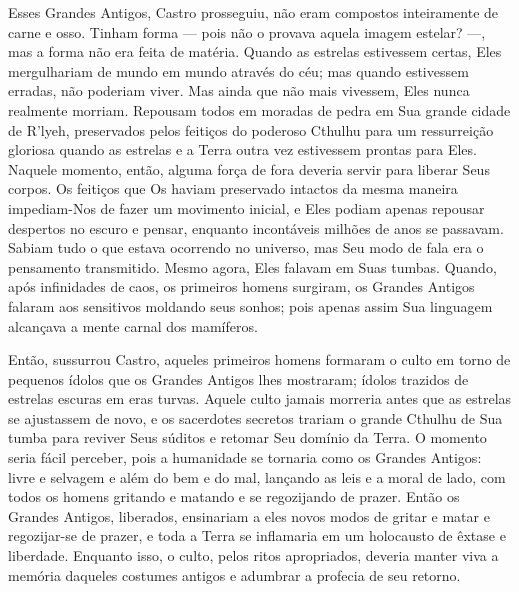 \begin{pages}
\begin{Rightside}
Esses Grandes Antigos, Castro prosseguiu, não eram compostos
inteiramente de carne e osso. Tinham forma --- pois não o provava aquela
imagem estelar? ---, mas a forma não era feita de matéria. Quando as
estrelas estivessem certas, Eles mergulhariam de mundo em mundo através
do céu; mas quando estivessem erradas, não poderiam viver. Mas ainda que
não mais vivessem, Eles nunca realmente morriam. Repousam todos em
moradas de pedra em Sua grande cidade de R'lyeh, preservados pelos
feitiços do poderoso Cthulhu para um ressurreição gloriosa quando as
estrelas e a Terra outra vez estivessem prontas para Eles. Naquele
momento, então, alguma força de fora deveria servir para liberar Seus
corpos. Os feitiços que Os haviam preservado intactos da mesma maneira
impediam-Nos de fazer um movimento inicial, e Eles podiam apenas
repousar despertos no escuro e pensar, enquanto incontáveis milhões de
anos se passavam. Sabiam tudo o que estava ocorrendo no universo, mas
Seu modo de fala era o pensamento transmitido. Mesmo agora, Eles falavam
em Suas tumbas. Quando, após infinidades de caos, os primeiros homens
surgiram, os Grandes Antigos falaram aos sensitivos moldando seus
sonhos; pois apenas assim Sua linguagem alcançava a mente carnal dos
mamíferos.

Então, sussurrou Castro, aqueles primeiros homens formaram o culto em
torno de pequenos ídolos que os Grandes Antigos lhes mostraram; ídolos
trazidos de estrelas escuras em eras turvas. Aquele culto jamais
morreria antes que as estrelas se ajustassem de novo, e os sacerdotes
secretos trariam o grande Cthulhu de Sua tumba para reviver Seus súditos
e retomar Seu domínio da Terra. O momento seria fácil perceber, pois a
humanidade se tornaria como os Grandes Antigos: livre e selvagem e além
do bem e do mal, lançando as leis e a moral de lado, com todos os homens
gritando e matando e se regozijando de prazer. Então os Grandes Antigos,
liberados, ensinariam a eles novos modos de gritar e matar e
regozijar-se de prazer, e toda a Terra se inflamaria em um holocausto de
êxtase e liberdade. Enquanto isso, o culto, pelos ritos apropriados,
deveria manter viva a memória daqueles costumes antigos e adumbrar a
profecia de seu retorno.


\end{Rightside}
\end{pages}
